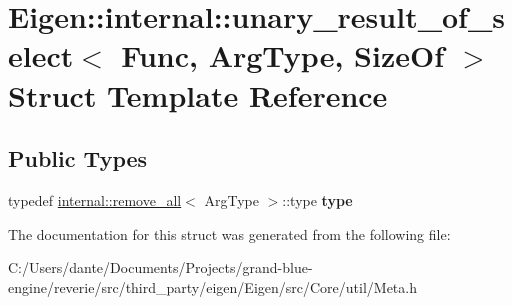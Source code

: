 \hypertarget{struct_eigen_1_1internal_1_1unary__result__of__select}{}\section{Eigen\+::internal\+::unary\+\_\+result\+\_\+of\+\_\+select$<$ Func, Arg\+Type, Size\+Of $>$ Struct Template Reference}
\label{struct_eigen_1_1internal_1_1unary__result__of__select}
\subsection*{Public Types}
\begin{DoxyCompactItemize}
\item 
\mbox{\label{struct_eigen_1_1internal_1_1unary__result__of__select_a164de616f14ad782f4de9221b84bc238}} 
typedef \mbox{\hyperlink{struct_eigen_1_1internal_1_1remove__all}{internal\+::remove\+\_\+all}}$<$ Arg\+Type $>$\+::type {\bfseries type}
\end{DoxyCompactItemize}


The documentation for this struct was generated from the following file\+:\begin{DoxyCompactItemize}
\item 
C\+:/\+Users/dante/\+Documents/\+Projects/grand-\/blue-\/engine/reverie/src/third\+\_\+party/eigen/\+Eigen/src/\+Core/util/Meta.\+h\end{DoxyCompactItemize}
